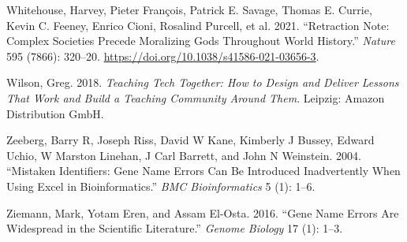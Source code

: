 \documentclass[
  12 pt,
]{paper}
\newlength{\cslhangindent}
\newlength{\cslentryspacingunit} %
\newenvironment{CSLReferences}[2] %
 {%
  \setlength{\parindent}{0pt}
  \ifodd #1
  \let\oldpar\par
  \def\par{\hangindent=\cslhangindent\oldpar}
  \fi
  \setlength{\parskip}{#2\cslentryspacingunit}
 }%
 {}
\begin{document}
\begin{CSLReferences}{1}{0}
\leavevmode{}%
Whitehouse, Harvey, Pieter François, Patrick E. Savage, Thomas E. Currie, Kevin C. Feeney, Enrico Cioni, Rosalind Purcell, et al. 2021. {``Retraction {Note}: {Complex} Societies Precede Moralizing Gods Throughout World History.''} \emph{Nature} 595 (7866): 320--20. \url{https://doi.org/10.1038/s41586-021-03656-3}.

\leavevmode{}%
Wilson, Greg. 2018. \emph{Teaching Tech Together: How to Design and Deliver Lessons That Work and Build a Teaching Community Around Them}. {Leipzig}: {Amazon Distribution GmbH}.

\leavevmode{}%
Zeeberg, Barry R, Joseph Riss, David W Kane, Kimberly J Bussey, Edward Uchio, W Marston Linehan, J Carl Barrett, and John N Weinstein. 2004. {``Mistaken Identifiers: Gene Name Errors Can Be Introduced Inadvertently When Using Excel in Bioinformatics.''} \emph{BMC Bioinformatics} 5 (1): 1--6.

\leavevmode{}%
Ziemann, Mark, Yotam Eren, and Assam El-Osta. 2016. {``Gene Name Errors Are Widespread in the Scientific Literature.''} \emph{Genome Biology} 17 (1): 1--3.

\end{CSLReferences}
\end{document}
